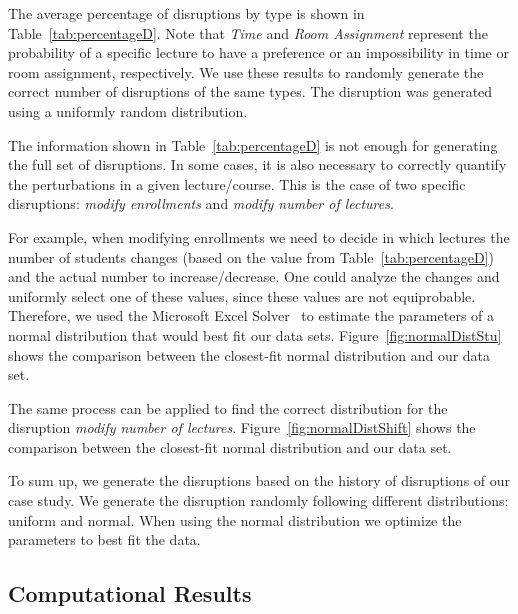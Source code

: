 \documentclass[runningheads]{llncs}
\begin{document}
The average percentage of disruptions by type is shown in Table~\ref{tab:percentageD}. Note that \textit{Time} and \textit{Room Assignment} represent the probability of a specific lecture to have a preference or an impossibility in time or room assignment, respectively. We use these results to randomly generate the correct number of disruptions of the same types. The disruption was generated using a uniformly random distribution. %


 The information shown in Table~\ref{tab:percentageD} is not enough for generating the full set of disruptions. In some cases, it is also necessary to correctly quantify the perturbations in a given lecture/course. This is the case of two specific disruptions: \textit{modify enrollments} and \textit{modify number of lectures}.
 
 For example, when modifying enrollments we need to decide in which lectures the number of students changes (based on the value from Table~\ref{tab:percentageD}) and the actual number to increase/decrease. One could analyze the changes and uniformly select one of these values, since these values are not equiprobable. Therefore, we used the Microsoft Excel Solver~\cite{DBLP:journals/interfaces/FylstraLWW98} to estimate the parameters of a normal distribution that would best fit our data sets. Figure~\ref{fig:normalDistStu} shows the comparison between the closest-fit normal distribution and our data set.
 
 The same process can be applied to find the correct distribution for the disruption \textit{modify number of lectures}. Figure~\ref{fig:normalDistShift} shows the comparison between the closest-fit normal distribution and our data set.
 
 To sum up, we generate the disruptions based on the history of disruptions of our case study. We generate the disruption randomly following different distributions: uniform and normal. When using the normal distribution we optimize the parameters to best fit the data. 
 
\subsection{Computational Results}
\end{document}
